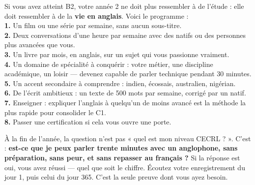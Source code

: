\begin{mission}
Si vous avez atteint B2, votre année 2 ne doit plus ressembler à de l'étude : elle doit
ressembler à de la \textbf{vie en anglais}. Voici le programme :\\
\textbf{1.} Un film ou une série par semaine, sans aucun sous-titre.\\
\textbf{2.} Deux conversations d'une heure par semaine avec des natifs ou des personnes
plus avancées que vous.\\
\textbf{3.} Un livre par mois, en anglais, sur un sujet qui vous passionne vraiment.\\
\textbf{4.} Un domaine de spécialité à conquérir : votre métier, une discipline académique,
un loisir --- devenez capable de parler technique pendant 30 minutes.\\
\textbf{5.} Un accent secondaire à comprendre : indien, écossais, australien, nigérian.\\
\textbf{6.} De l'écrit ambitieux : un texte de 500 mots par semaine, corrigé par un natif.\\
\textbf{7.} Enseigner : expliquer l'anglais à quelqu'un de moins avancé est la méthode la
plus rapide pour consolider le C1.\\
\textbf{8.} Passer une certification si cela vous ouvre une porte.
\end{mission}

\begin{memo}
À la fin de l'année, la question n'est pas « quel est mon niveau CECRL ? ». C'est :
\textbf{est-ce que je peux parler trente minutes avec un anglophone, sans préparation,
sans peur, et sans repasser au français ?} Si la réponse est oui, vous avez réussi ---
quel que soit le chiffre. Écoutez votre enregistrement du jour 1, puis celui du jour 365.
C'est la seule preuve dont vous ayez besoin.
\end{memo}
